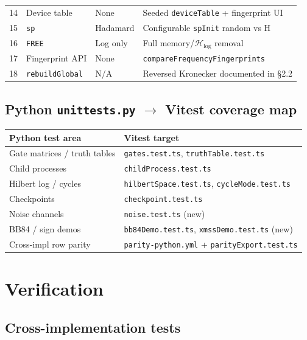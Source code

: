 \documentclass[11pt,a4paper]{article}
\newcommand{\HS}{\mathcal{H}_{\mathrm{log}}}
\begin{document}
\begin{center}
\begin{tabular}{@{}p{0.4cm}p{2.8cm}p{5.5cm}p{5.8cm}@{}}
14 & Device table & None & Seeded \texttt{deviceTable} + fingerprint UI \\
15 & \texttt{sp} & Hadamard & Configurable \texttt{spInit} random vs H \\
16 & \texttt{FREE} & Log only & Full memory/$\HS$ removal \\
17 & Fingerprint API & None & \texttt{compareFrequencyFingerprints} \\
18 & \texttt{rebuildGlobal} & N/A & Reversed Kronecker documented in \S2.2 \\
\bottomrule
\end{tabular}
\end{center}

\subsection{Python \texttt{unittests.py} $\rightarrow$ Vitest coverage map}

\begin{center}
\small
\begin{tabular}{@{}ll@{}}
\toprule
Python test area & Vitest target \\
\midrule
Gate matrices / truth tables & \texttt{gates.test.ts}, \texttt{truthTable.test.ts} \\
Child processes & \texttt{childProcess.test.ts} \\
Hilbert log / cycles & \texttt{hilbertSpace.test.ts}, \texttt{cycleMode.test.ts} \\
Checkpoints & \texttt{checkpoint.test.ts} \\
Noise channels & \texttt{noise.test.ts} (new) \\
BB84 / sign demos & \texttt{bb84Demo.test.ts}, \texttt{xmssDemo.test.ts} (new) \\
Cross-impl row parity & \texttt{parity-python.yml} + \texttt{parityExport.test.ts} \\
\bottomrule
\end{tabular}
\end{center}

\section{Verification}

\subsection{Cross-implementation tests}
\end{document}

